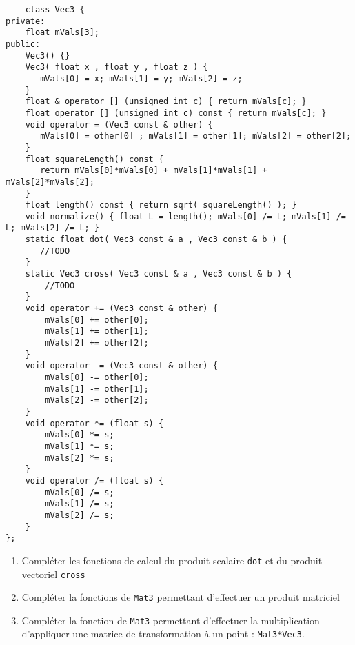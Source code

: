 \documentclass[a4paper,10pt]{tp_um}
\newcommand\code[1]{\texttt{#1}}
\begin{document}
\begin{verbatim}
    class Vec3 {
private:
    float mVals[3];
public:
    Vec3() {}
    Vec3( float x , float y , float z ) {
       mVals[0] = x; mVals[1] = y; mVals[2] = z;
    }
    float & operator [] (unsigned int c) { return mVals[c]; }
    float operator [] (unsigned int c) const { return mVals[c]; }
    void operator = (Vec3 const & other) {
       mVals[0] = other[0] ; mVals[1] = other[1]; mVals[2] = other[2];
    }
    float squareLength() const {
       return mVals[0]*mVals[0] + mVals[1]*mVals[1] + mVals[2]*mVals[2];
    }
    float length() const { return sqrt( squareLength() ); }
    void normalize() { float L = length(); mVals[0] /= L; mVals[1] /= L; mVals[2] /= L; }
    static float dot( Vec3 const & a , Vec3 const & b ) {
       //TODO
    }
    static Vec3 cross( Vec3 const & a , Vec3 const & b ) {
        //TODO
    }
    void operator += (Vec3 const & other) {
        mVals[0] += other[0];
        mVals[1] += other[1];
        mVals[2] += other[2];
    }
    void operator -= (Vec3 const & other) {
        mVals[0] -= other[0];
        mVals[1] -= other[1];
        mVals[2] -= other[2];
    }
    void operator *= (float s) {
        mVals[0] *= s;
        mVals[1] *= s;
        mVals[2] *= s;
    }
    void operator /= (float s) {
        mVals[0] /= s;
        mVals[1] /= s;
        mVals[2] /= s;
    }
};
\end{verbatim}

\begin{enumerate}
 \item Compléter les fonctions de calcul du produit scalaire \code{dot} et du produit vectoriel \code{cross}
\item Compléter la fonctions de \code{Mat3} permettant d'effectuer un produit matriciel
\item Compléter la fonction de \code{Mat3} permettant d'effectuer la multiplication d'appliquer une matrice de transformation à un point : \code{Mat3*Vec3}.
\end{enumerate}
\end{document}

